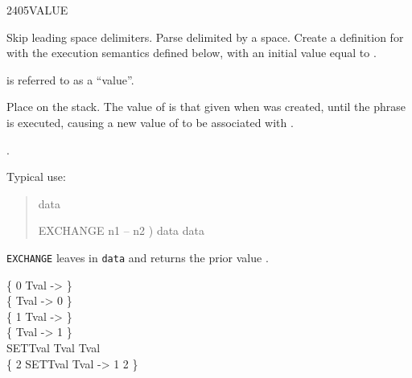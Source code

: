 \begin{worddef}{2405}{VALUE}
\item {}

	Skip leading space delimiters. Parse  delimited by
	a space. Create a definition for  with the execution
	semantics defined below, with an initial value equal to .

	 is referred to as a ``value''.

\execute[name]

	Place  on the stack. The value of  is that
	given when  was created, until the phrase 
	  is executed, causing a new value of
	 to be associated with .



\see {}
	.

	\begin{defer}
	\rationale %
		Typical use:
		\begin{quote}  data

			\word{:} EXCHANGE  n1 -- n2 )
				data   data
			\word{;}
		\end{quote}
		\texttt{EXCHANGE} leaves  in \texttt{data} and
		returns the prior value .

	\testing
		\cbstart{}
		\{ 0  Tval -> \} \\
		\{ Tval -> 0 \} \\

		\{ 1  Tval -> \} \\
		\{ Tval -> 1 \} \\

		\word{:} SETTval Tval   Tval \word{;} \\
		\{ 2 SETTval Tval -> 1 2 \}
		\cbend
	\end{defer}
\end{worddef}


